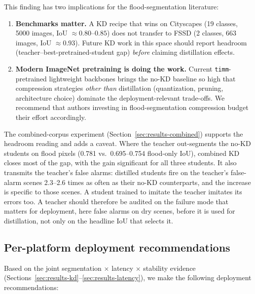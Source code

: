 This finding has two implications for the flood-segmentation literature:

\begin{enumerate}
\item \textbf{Benchmarks matter.} A KD recipe that wins on Cityscapes (19 classes, 5000 images, IoU $\approx 0.80$--$0.85$) does not transfer to FSSD (2 classes, 663 images, IoU $\approx 0.93$). Future KD work in this space should report headroom (teacher--best-pretrained-student gap) \emph{before} claiming distillation effects.
\item \textbf{Modern ImageNet pretraining is doing the work.} Current \texttt{timm}-pretrained lightweight backbones brings the no-KD baseline so high that compression strategies \emph{other than} distillation (quantization, pruning, architecture choice) dominate the deployment-relevant trade-offs. We recommend that authors investing in flood-segmentation compression budget their effort accordingly.
\end{enumerate}

The combined-corpus experiment (Section~\ref{sec:results-combined}) supports the headroom reading and adds a caveat. Where the teacher out-segments the no-KD students on flood pixels (0.781 vs.\ 0.695--0.754 flood-only IoU), combined KD closes most of the gap, with the gain significant for all three students. It also transmits the teacher's false alarms: distilled students fire on the teacher's false-alarm scenes 2.3--2.6 times as often as their no-KD counterparts, and the increase is specific to those scenes. A student trained to imitate the teacher imitates its errors too. A teacher should therefore be audited on the failure mode that matters for deployment, here false alarms on dry scenes, before it is used for distillation, not only on the headline IoU that selects it.

\subsection{Per-platform deployment recommendations}
\label{sec:discussion-deployment}

Based on the joint segmentation $\times$ latency $\times$ stability evidence (Sections~\ref{sec:results-kd}--\ref{sec:results-latency}), we make the following deployment recommendations:

